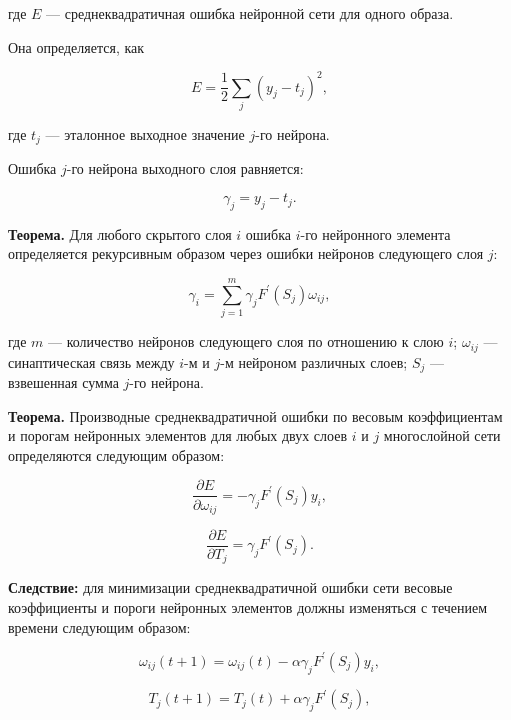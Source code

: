 где $E$ — среднеквадратичная ошибка нейронной сети для одного образа.

Она определяется, как

\begin{equation}
    E = \frac{1}{2} \sum_{j}{(y_j - t_j)^2},
\end{equation}

где $t_j$ — эталонное выходное значение $j$-го нейрона.

Ошибка $j$-го нейрона выходного слоя равняется:

\begin{equation}
    \gamma_j = y_j - t_j.
\end{equation}

\textbf{Теорема.} Для любого скрытого слоя $i$ ошибка $i$-го нейронного элемента определяется рекурсивным образом через ошибки нейронов следующего слоя $j$:

\begin{equation}
    \gamma_i = \sum_{j = 1}^{m}{\gamma_j F^\prime(S_j)\omega_{i j},}
\end{equation}

где $m$ — количество нейронов следующего слоя по отношению к слою $i$; $\omega_{i j}$ — синаптическая связь между $i$-м и $j$-м нейроном различных слоев; $S_j$ — взвешенная сумма $j$-го нейрона.

\textbf{Теорема.} Производные среднеквадратичной ошибки по весовым коэффициентам и порогам нейронных элементов для любых двух слоев $i$ и $j$ многослойной сети определяются следующим образом:

\begin{equation}
    \frac{\partial E}{\partial\omega_{i j}} = -\gamma_j F^\prime(S_j) y_i,
\end{equation}

\begin{equation}
    \frac{\partial E}{\partial T_j} = \gamma_j F^\prime(S_j).
\end{equation}

\textbf{Следствие:} для минимизации среднеквадратичной ошибки сети весовые коэффициенты и пороги нейронных элементов должны изменяться с течением времени следующим образом:

\begin{equation}
    \omega_{i j}(t + 1) = \omega_{i j}(t) - \alpha\gamma_jF^\prime(S_j) y_i,
\end{equation}

\begin{equation}
    T_j(t + 1) = T_j(t) + \alpha\gamma_jF^\prime(S_j),
\end{equation}

